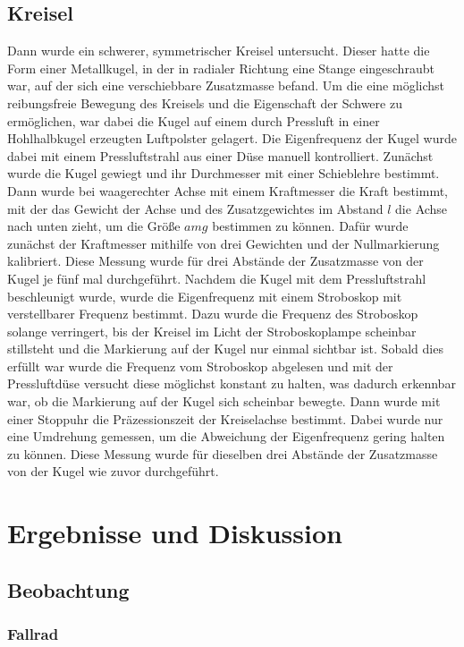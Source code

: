 \documentclass[
	a4paper,
	12pt,
	pagesize,
	ngerman
]{scrartcl}
\begin{document}
	\subsection{Kreisel}
	Dann wurde ein schwerer, symmetrischer Kreisel untersucht.
	Dieser hatte die Form einer Metallkugel, in der in radialer Richtung eine Stange eingeschraubt war, auf der sich eine verschiebbare Zusatzmasse befand.
	Um die eine möglichst reibungsfreie Bewegung des Kreisels und die Eigenschaft der Schwere zu ermöglichen, war dabei die Kugel auf einem durch Pressluft in einer Hohlhalbkugel erzeugten Luftpolster gelagert.
	Die Eigenfrequenz der Kugel wurde dabei mit einem Pressluftstrahl aus einer Düse manuell kontrolliert.
	Zunächst wurde die Kugel gewiegt und ihr Durchmesser mit einer Schieblehre bestimmt.
	Dann wurde bei waagerechter Achse mit einem Kraftmesser die Kraft bestimmt, mit der das Gewicht der Achse und des Zusatzgewichtes im Abstand $ l $ die Achse nach unten zieht, um die Größe $ amg$ bestimmen zu können. %
	Dafür wurde zunächst der Kraftmesser mithilfe von drei Gewichten und der Nullmarkierung kalibriert.
	Diese Messung wurde für drei Abstände der Zusatzmasse von der Kugel je fünf mal durchgeführt.
	Nachdem die Kugel mit dem Pressluftstrahl beschleunigt wurde, wurde die Eigenfrequenz mit einem Stroboskop mit verstellbarer Frequenz bestimmt.
	Dazu wurde die Frequenz des Stroboskop solange verringert, bis der Kreisel im Licht der Stroboskoplampe scheinbar stillsteht und die Markierung auf der Kugel nur einmal sichtbar ist.
	Sobald dies erfüllt war wurde die Frequenz vom Stroboskop abgelesen und mit der Pressluftdüse versucht diese möglichst konstant zu halten, was dadurch erkennbar war, ob die Markierung auf der Kugel sich scheinbar bewegte.
	Dann wurde mit einer Stoppuhr die Präzessionszeit der Kreiselachse bestimmt.
	Dabei wurde nur eine Umdrehung gemessen, um die Abweichung der Eigenfrequenz gering halten zu können.
	Diese Messung wurde für dieselben drei Abstände der Zusatzmasse von der Kugel wie zuvor durchgeführt.
	
	
	\section{Ergebnisse und Diskussion}
	

	\subsection{Beobachtung}
	\subsubsection{Fallrad}
\end{document}
